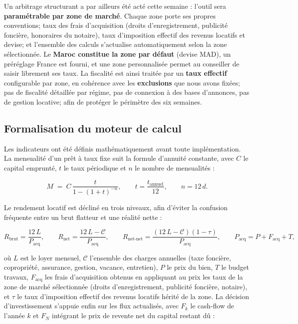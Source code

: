 \documentclass[11pt,a4paper]{article}
\begin{document}
Un arbitrage structurant a par ailleurs été acté cette semaine : l'outil sera \textbf{paramétrable par zone de marché}. Chaque zone porte ses propres conventions; taux des frais d'acquisition (droits d'enregistrement, publicité foncière, honoraires du notaire), taux d'imposition effectif des revenus locatifs et devise; et l'ensemble des calculs s'actualise automatiquement selon la zone sélectionnée. Le \textbf{Maroc constitue la zone par défaut} (devise MAD), un préréglage France est fourni, et une zone personnalisée permet au conseiller de saisir librement ses taux. La fiscalité est ainsi traitée par un \textbf{taux effectif} configurable par zone, en cohérence avec les \textbf{exclusions} que nous avons fixées; pas de fiscalité détaillée par régime, pas de connexion à des bases d'annonces, pas de gestion locative; afin de protéger le périmètre des six semaines.
	
	\subsection{Formalisation du moteur de calcul}
	Les indicateurs ont été définis mathématiquement avant toute implémentation. La mensualité d'un prêt à taux fixe suit la formule d'annuité constante, avec $C$ le capital emprunté, $t$ le taux périodique et $n$ le nombre de mensualités :
	
	\begin{equation*}
		M \;=\; C\,\frac{t}{1-(1+t)^{-n}}, \qquad t=\frac{t_{\text{annuel}}}{12}, \qquad n = 12\,d.
	\end{equation*}
	
	Le rendement locatif est décliné en trois niveaux, afin d'éviter la confusion fréquente entre un brut flatteur et une réalité nette :
	
	\begin{equation*}
		R_{\text{brut}}=\frac{12\,L}{P_{\text{acq}}}, \qquad
		R_{\text{net}}=\frac{12\,L-\mathcal{C}}{P_{\text{acq}}}, \qquad
		R_{\text{net-net}}=\frac{(12\,L-\mathcal{C})(1-\tau)}{P_{\text{acq}}}, \qquad
		P_{\text{acq}} = P + F_{\text{acq}} + T,
	\end{equation*}

	où $L$ est le loyer mensuel, $\mathcal{C}$ l'ensemble des charges annuelles (taxe foncière, copropriété, assurance, gestion, vacance, entretien), $P$ le prix du bien, $T$ le budget travaux, $F_{\text{acq}}$ les frais d'acquisition obtenus en appliquant au prix les taux de la zone de marché sélectionnée (droits d'enregistrement, publicité foncière, notaire), et $\tau$ le taux d'imposition effectif des revenus locatifs hérité de la zone. La décision d'investissement s'appuie enfin sur les flux actualisés, avec $F_k$ le cash-flow de l'année $k$ et $F_N$ intégrant le prix de revente net du capital restant dû :
	
\end{document}
